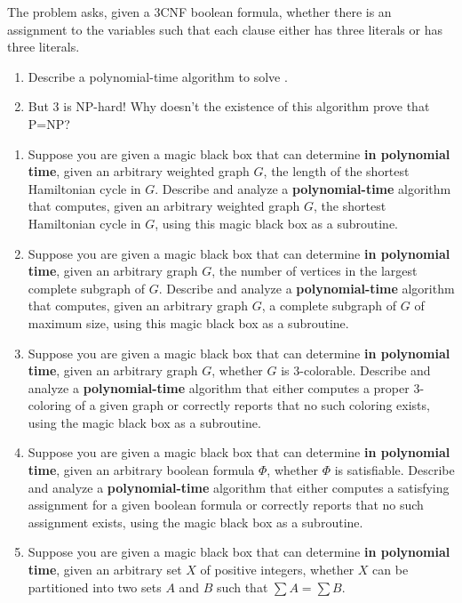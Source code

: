 \begin{exercises}
\item The problem  asks, given a 3CNF boolean formula, whether there is an assignment to the variables such that each clause either has three  literals or has three  literals.
\begin{enumerate}
\item Describe a polynomial-time algorithm to solve .
\item But 3 is NP-hard!
Why doesn’t the existence of this algorithm prove that P=NP?
\end{enumerate}

\item
\begin{enumerate}
\item Suppose you are given a magic black box that can determine \textbf{in polynomial time}, given an arbitrary weighted graph $G$, the length of the shortest Hamiltonian cycle in $G$.
Describe and analyze a \textbf{polynomial-time} algorithm that computes, given an arbitrary weighted graph $G$, the shortest Hamiltonian cycle in $G$, using this magic black box as a subroutine.
\item Suppose you are given a magic black box that can determine \textbf{in polynomial time}, given an arbitrary graph $G$, the number of vertices in the largest complete subgraph of $G$.
Describe and analyze a \textbf{polynomial-time} algorithm that computes, given an arbitrary graph $G$, a complete subgraph of $G$ of maximum size, using this magic black box as a subroutine.
\item Suppose you are given a magic black box that can determine \textbf{in polynomial time}, given an arbitrary graph $G$, whether $G$ is $3$-colorable.
Describe and analyze a \textbf{polynomial-time} algorithm that either computes a proper $3$-coloring of a given graph or correctly reports that no such coloring exists, using the magic black box as a subroutine.
\item Suppose you are given a magic black box that can determine \textbf{in polynomial time}, given an arbitrary boolean formula $\Phi$, whether $\Phi$ is satisfiable.
Describe and analyze a \textbf{polynomial-time} algorithm that either computes a satisfying assignment for a given boolean formula or correctly reports that no such assignment exists, using the magic black box as a subroutine.
\item Suppose you are given a magic black box that can determine \textbf{in polynomial time}, given an arbitrary set $X$ of positive integers, whether $X$ can be partitioned into two sets $A$ and $B$ such that $\sum A = \sum B$.

\end{enumerate}
\end{exercises}
